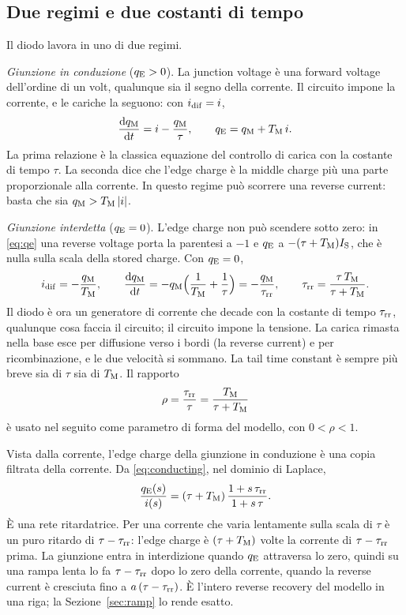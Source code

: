 \documentclass[10pt,a4paper]{scrartcl}
\let\newcommand\lmitdefine
\newcommand{\taurr}{\tau_\mathrm{rr}}
\newcommand{\TM}{T_\mathrm{M}}
\newcommand{\qE}{q_\mathrm{E}}
\newcommand{\qM}{q_\mathrm{M}}
\newcommand{\idif}{i_\mathrm{dif}}
\newcommand{\IS}{I_\mathrm{S}}
\newcommand{\diff}{\mathrm{d}}
\begin{document}
\subsection{Due regimi e due costanti di tempo}
\label{sec:regimes}
Il diodo lavora in uno di due regimi.

\emph{Giunzione in conduzione} ($\qE > 0$). La junction voltage è una forward voltage dell'ordine di un volt, qualunque sia il segno della corrente. Il circuito impone la corrente, e le cariche la seguono: con $\idif = i$,
\begin{equation}
\frac{\diff \qM}{\diff t} = i - \frac{\qM}{\tau} , \qquad \qE = \qM + \TM\, i .
\label{eq:conducting}
\end{equation}
La prima relazione è la classica equazione del controllo di carica con la costante di tempo $\tau$. La seconda dice che l'edge charge è la middle charge più una parte proporzionale alla corrente. In questo regime può scorrere una reverse current: basta che sia $\qM > \TM\,|i|$.

\emph{Giunzione interdetta} ($\qE = 0$). L'edge charge non può scendere sotto zero: in \eqref{eq:qe} una reverse voltage porta la parentesi a $-1$ e $\qE$ a $-(\tau+\TM)\IS$, che è nulla sulla scala della stored charge. Con $\qE = 0$,
\begin{equation}
\idif = -\frac{\qM}{\TM} , \qquad \frac{\diff\qM}{\diff t} = -\qM\Bigl(\frac1\TM + \frac1\tau\Bigr) = -\frac{\qM}{\taurr} , \qquad \taurr = \frac{\tau\,\TM}{\tau+\TM} .
\label{eq:blocked}
\end{equation}
Il diodo è ora un generatore di corrente che decade con la costante di tempo $\taurr$, qualunque cosa faccia il circuito; il circuito impone la tensione. La carica rimasta nella base esce per diffusione verso i bordi (la reverse current) e per ricombinazione, e le due velocità si sommano. La tail time constant è sempre più breve sia di $\tau$ sia di $\TM$. Il rapporto
\begin{equation}
\rho = \frac{\taurr}{\tau} = \frac{\TM}{\tau+\TM}
\label{eq:rho}
\end{equation}
è usato nel seguito come parametro di forma del modello, con $0 < \rho < 1$.

Vista dalla corrente, l'edge charge della giunzione in conduzione è una copia filtrata della corrente. Da \eqref{eq:conducting}, nel dominio di Laplace,
\begin{equation}
\frac{\qE(s)}{i(s)} = (\tau+\TM)\,\frac{1+s\,\taurr}{1+s\,\tau} .
\label{eq:filter}
\end{equation}
È una rete ritardatrice. Per una corrente che varia lentamente sulla scala di $\tau$ è un puro ritardo di $\tau-\taurr$: l'edge charge è $(\tau+\TM)$ volte la corrente di $\tau-\taurr$ prima. La giunzione entra in interdizione quando $\qE$ attraversa lo zero, quindi su una rampa lenta lo fa $\tau-\taurr$ dopo lo zero della corrente, quando la reverse current è cresciuta fino a $a\,(\tau-\taurr)$. È l'intero reverse recovery del modello in una riga; la Sezione~\ref{sec:ramp} lo rende esatto.
\end{document}
